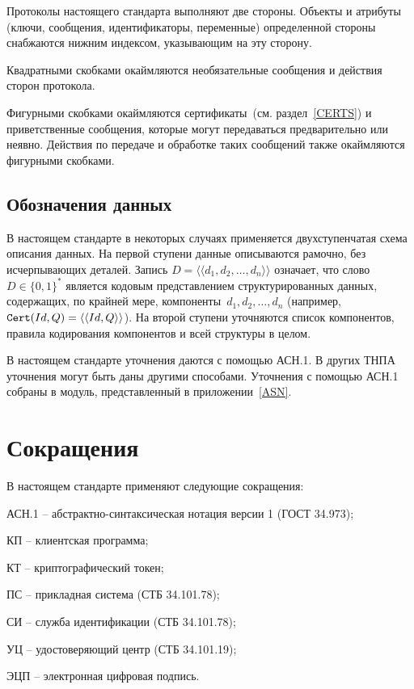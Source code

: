 Протоколы настоящего стандарта выполняют две стороны.
Объекты и атрибуты (ключи, сообщения, идентификаторы, переменные)
определенной стороны снабжаются нижним индексом,
указывающим на эту сторону.

Квадратными скобками окаймляются 
необязательные сообщения и действия сторон протокола.

Фигурными скобками окаймляются сертификаты~(см. раздел~\ref{CERTS})
и приветственные сообщения,
которые могут передаваться предварительно или неявно. 
Действия по передаче и обработке таких сообщений
также окаймляются фигурными скобками.

\subsection{Обозначения данных}

В настоящем стандарте в некоторых случаях применяется двухступенчатая 
схема описания данных. На первой ступени данные описываются рамочно, без 
исчерпывающих деталей. Запись $D = \langle\langle d_1, d_2,\ldots, d_n\rangle\rangle$ 
означает, что слово $D \in\{0,1\}^*$ является кодовым представлением 
структурированных данных, содержащих, по крайней мере, 
компоненты~$d_1,d_2,\ldots,d_n$
(например, $\texttt{Cert}(Id,Q)=\langle\langle Id,Q\rangle\rangle$).
%
На второй ступени  уточняются список компонентов, правила кодирования
компонентов и всей структуры в целом.

В настоящем стандарте уточнения даются с помощью АСН.1.
В других ТНПА уточнения могут быть даны другими способами.
Уточнения с помощью АСН.1 собраны в модуль, представленный 
в приложении~\ref{ASN}. 

\section{Сокращения}

В настоящем стандарте применяют следующие сокращения:

АСН.1 -- абстрактно-синтаксическая нотация версии 1 (ГОСТ 34.973);

КП -- клиентская программа;

КТ -- криптографический токен;

ПС -- прикладная система (СТБ 34.101.78);

СИ -- служба идентификации (СТБ 34.101.78);

УЦ -- удостоверяющий центр (СТБ 34.101.19);

ЭЦП -- электронная цифровая подпись.


